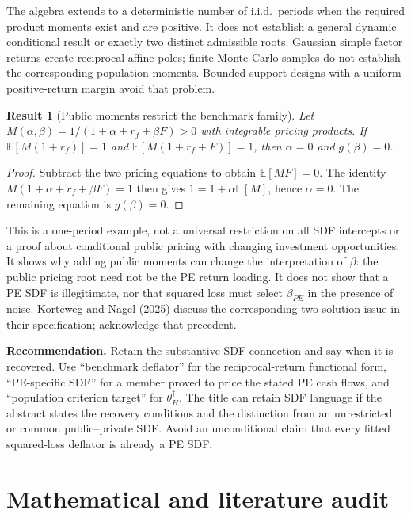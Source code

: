 \documentclass[11pt]{article}
\newcommand{\E}{\mathbb{E}}
\theoremstyle{plain}
\newtheorem{result}{Result}[section]
\theoremstyle{definition}
\begin{document}
The algebra extends to a deterministic number of i.i.d.\ periods when the required product moments exist and are positive. It does not establish a general dynamic conditional result or exactly two distinct admissible roots. Gaussian simple factor returns create reciprocal-affine poles; finite Monte Carlo samples do not establish the corresponding population moments. Bounded-support designs with a uniform positive-return margin avoid that problem.

\begin{result}[Public moments restrict the benchmark family]
\label{res:pin}
Let $M(\alpha,\beta)=1/(1+\alpha+r_f+\beta F)>0$ with integrable pricing products. If $\E[M(1+r_f)]=1$ and $\E[M(1+r_f+F)]=1$, then $\alpha=0$ and $g(\beta)=0$.
\end{result}
\begin{proof}
Subtract the two pricing equations to obtain $\E[MF]=0$. The identity $M(1+\alpha+r_f+\beta F)=1$ then gives $1=1+\alpha\E[M]$, hence $\alpha=0$. The remaining equation is $g(\beta)=0$.
\end{proof}

This is a one-period example, not a universal restriction on all SDF intercepts or a proof about conditional public pricing with changing investment opportunities. It shows why adding public moments can change the interpretation of $\beta$: the public pricing root need not be the PE return loading. It does not show that a PE SDF is illegitimate, nor that squared loss must select $\beta_{PE}$ in the presence of noise. Korteweg and Nagel (2025) discuss the corresponding two-solution issue in their specification; acknowledge that precedent.

\textbf{Recommendation.} Retain the substantive SDF connection and say when it is recovered. Use ``benchmark deflator'' for the reciprocal-return functional form, ``PE-specific SDF'' for a member proved to price the stated PE cash flows, and ``population criterion target'' for $\theta_H^\dagger$. The title can retain SDF language if the abstract states the recovery conditions and the distinction from an unrestricted or common public--private SDF. Avoid an unconditional claim that every fitted squared-loss deflator is already a PE SDF.

\section{Mathematical and literature audit}
\label{sec:audit}
\end{document}
